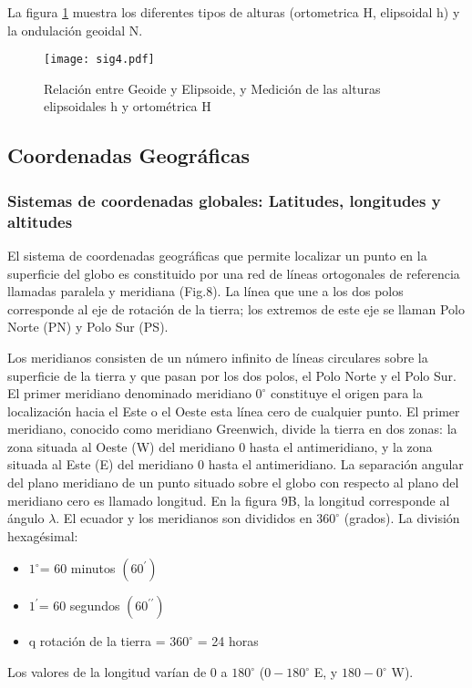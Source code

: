   La figura \ref{sig4} muestra los diferentes tipos de alturas (ortometrica H, elipsoidal h) y la ondulación geoidal N.
  \begin{figure}[h!]
  \centering
    \texttt{[image: sig4.pdf]}
    \caption{Relación entre Geoide y Elipsoide, y Medición de las alturas elipsoidales h y ortométrica H}
    \label{sig4}
  \end{figure}

\subsection{Coordenadas Geográficas}
\subsubsection{Sistemas de coordenadas globales: Latitudes, longitudes y altitudes}
El sistema de coordenadas geográficas que permite localizar un punto en la superficie del globo es constituido por una red de líneas ortogonales de referencia llamadas paralela y meridiana (Fig.8).  La línea que une a los dos polos corresponde al eje de rotación de la tierra; los extremos de este eje se llaman Polo Norte (PN) y Polo Sur (PS).

Los meridianos consisten de un número infinito de líneas circulares sobre la superficie de la tierra y que pasan por los dos polos, el Polo Norte y el Polo Sur. El primer meridiano denominado meridiano $0^{\circ}$ constituye el origen para la localización hacia el Este o el Oeste esta línea cero de cualquier punto. El primer meridiano, conocido como meridiano Greenwich, divide la tierra en dos zonas: la zona situada al Oeste (W) del meridiano 0 hasta el antimeridiano, y la zona situada al Este (E) del meridiano 0 hasta el antimeridiano. La separación angular del plano meridiano de un punto situado sobre el globo con respecto al plano del meridiano cero es llamado longitud. En la figura 9B, la longitud corresponde al ángulo $\lambda$. El ecuador y los meridianos son divididos en $360^{\circ}$ (grados). La división hexagésimal:
\begin{itemize}
  \item $1^{\circ}$= 60 minutos $(60^{\prime})$
  \item $1^{\prime}$= 60 segundos $(60^{\prime\prime})$
  \item q rotación de la tierra = $360^{\circ}$ = 24 horas
\end{itemize}
Los valores de la longitud varían de 0 a $180^{\circ}$ ($0-180^{\circ}$ E, y $180-0^{\circ}$ W).

